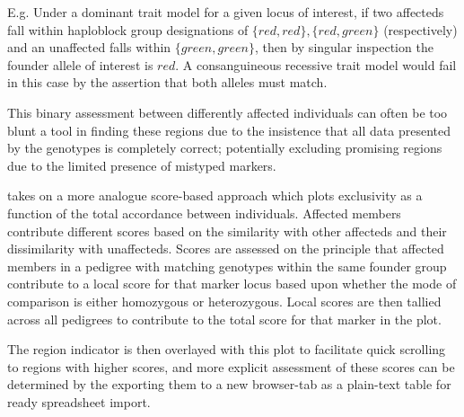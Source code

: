   E.g. Under a dominant trait model for a given locus of interest, if two affecteds fall within haploblock group designations of  $\{red,red\}, \{red,green\}$ (respectively) and an unaffected falls within $\{green,green\}$, then by singular inspection the founder allele of interest is $red$. A consanguineous recessive trait model would fail in this case by the assertion that both alleles must match.

This binary assessment between differently affected individuals can often be too blunt a tool in finding these regions due to the insistence that all data presented by the genotypes is completely correct; potentially excluding promising regions due to the limited presence of mistyped markers. 

\app takes on a more analogue score-based approach which plots exclusivity as a function of the total accordance between individuals. Affected members contribute different scores based on the similarity with other affecteds and their dissimilarity with unaffecteds. Scores are assessed on the principle that affected members in a pedigree with matching genotypes within the same founder group contribute to a local score for that marker locus based upon whether the mode of comparison is either homozygous or heterozygous. Local scores are then tallied across all pedigrees to contribute to the total score for that marker in the plot.


The region indicator is then overlayed with this plot to facilitate quick scrolling to regions with higher scores, and more explicit assessment of these scores can be determined by the exporting them to a new browser-tab as a plain-text table for ready spreadsheet import.

